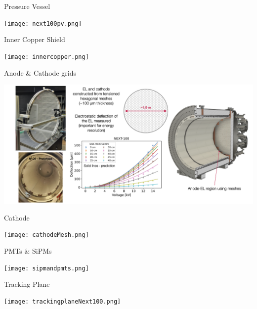 \documentclass [aspectratio=169]{beamer}
\begin{document}
\begin{frame}{Pressure Vessel}

\texttt{[image: next100pv.png]}

\end{frame}

\begin{frame}{Inner Copper Shield}

\texttt{[image: innercopper.png]}

\end{frame}

\begin{frame}{Anode \& Cathode grids}

\includegraphics[scale=0.23]{meshes.png}

\end{frame}


\begin{frame}{Cathode}

\texttt{[image: cathodeMesh.png]}

\end{frame}


\begin{frame}{PMTs \& SiPMs}

\texttt{[image: sipmandpmts.png]}

\end{frame}


\begin{frame}{Tracking Plane}

\texttt{[image: trackingplaneNext100.png]}

\end{frame}
\end{document}
